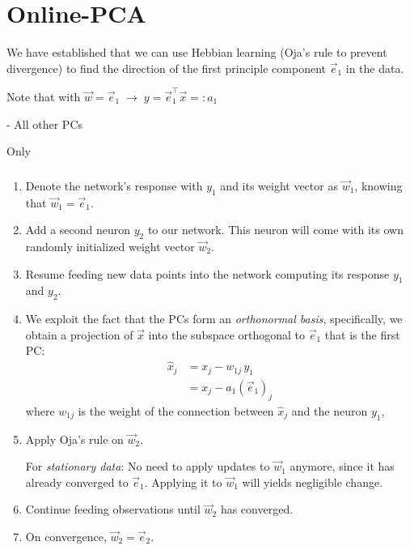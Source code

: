 
\section{Online-PCA}


\begin{frame}
We have established that we can use Hebbian learning (Oja's rule to prevent divergence) 
to find the direction of the first principle component $\vec e_1$ in the data. \\

\pause

Note that with $\vec w = \vec e_1 \; \rightarrow \; y = \vec e_1^\top \vec x =: a_1$\\


\pause

- All other PCs

\end{frame}

\begin{frame}{Only}\frametitle{\secname}
\begin{enumerate}
\item<only@1-3> Denote the network's response with $y_1$ and its weight vector as $\vec w_1$, knowing that $\vec w_1 = \vec e_1$.
\item<only@1-3> Add a second neuron $y_2$ to our network. This neuron will come with its own randomly initialized weight vector $\vec w_2$.
\item<only@1-3,4> Resume feeding new data points into the network computing its response $y_1$ and $y_2$.
\item<only@4,5> We exploit the fact that the PCs form an \emph{orthonormal basis}, specifically, we obtain a projection of $\vec x$ 
into the subspace orthogonal to $\vec e_1$ that is the first PC:
\begin{align}
\hat x_j &= x_j - w_{1j} \, y_1 \\
         &= x_j - a_1 (\vec e_1)_j
\end{align}
where $w_{1j}$ is the weight of the connection between $\hat x_j$ and the neuron $y_1$,
\item<only@4-> Apply Oja's rule on $\vec w_2$.

For \emph{stationary data}: No need to apply updates to $\vec w_1$ anymore, since it has already converged to $\vec e_1$. Applying it to $\vec w_1$ will yields negligible change.
 
\item<only@4-> Continue feeding observations until $\vec w_2$ has converged.
\item<only@4-> On convergence, $\vec w_2 = \vec e_2$.
\end{enumerate}

\end{frame}

